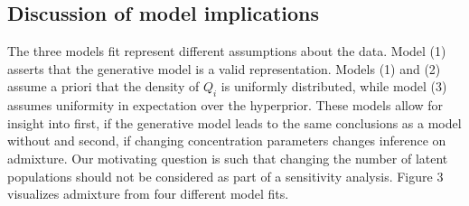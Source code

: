 \documentclass{article}
\begin{document}
\subsection{Discussion of model implications}

The three models fit represent different assumptions about the data. Model (1) asserts that the generative model is a valid representation. Models (1) and (2) assume a priori that the density of $Q_i$ is uniformly distributed, while model (3) assumes uniformity in expectation over the hyperprior. These models allow for insight into first, if the generative model leads to the same conclusions as a model without and second, if changing concentration parameters changes inference on admixture. Our motivating question is such that changing the number of latent populations should not be considered as part of a sensitivity analysis. Figure 3 visualizes admixture from four different model fits. 
\end{document}
